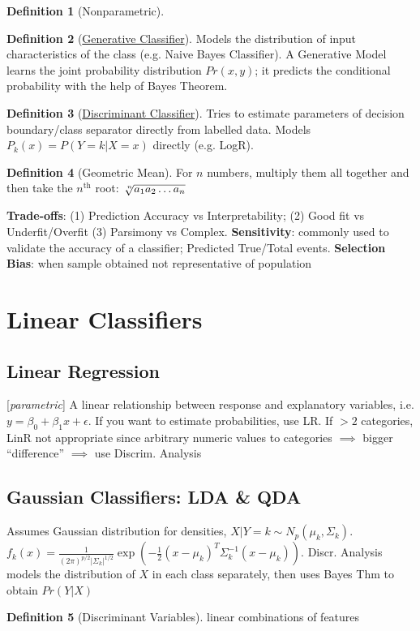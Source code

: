\documentclass[9pt]{article}
\theoremstyle{definition}
\newtheorem{definition}{Definition}[section]
\begin{document}
\begin{multicols}{2}
\begin{definition}[Nonparametric]
\end{definition}
\begin{definition}[\href{https://medium.com/@mlengineer/generative-and-discriminative-models-af5637a66a3}{Generative Classifier}]
    Models the distribution of input characteristics of the class (e.g. Naive Bayes Classifier).  A Generative Model learns the joint probability distribution $Pr(x,y)$; it predicts the conditional probability with the help of Bayes Theorem.
\end{definition}
\begin{definition}[\href{https://medium.com/@mlengineer/generative-and-discriminative-models-af5637a66a3}{Discriminant Classifier}]
    Tries to estimate parameters of decision boundary/class separator directly from labelled data. Models $P_k(x)=P(Y=k|X=x)$ directly (e.g. LogR).
\end{definition}
\begin{definition}[Geometric Mean]
    For $n$ numbers, multiply them all together and then take the $n^{\text{th}}$ root: $\sqrt[\leftroot{-2}\uproot{2}n]{a_1 a_2\dots a_n}$
\end{definition}
\textbf{Trade-offs}: (1) Prediction Accuracy vs Interpretability; (2) Good fit vs Underfit/Overfit (3) Parsimony vs Complex. \textbf{Sensitivity}: commonly used to validate the accuracy of a classifier; Predicted True/Total events. \textbf{Selection Bias}: when sample obtained not representative of population
\section{Linear Classifiers}
\subsection{Linear Regression}
[\textit{parametric}] A linear relationship between response and explanatory variables, i.e. $y = \beta_0+\beta_1x+\epsilon$.  If you want to estimate probabilities, use LR.  If $>2$ categories, LinR not appropriate since arbitrary numeric values to categories $\implies$ bigger ``difference'' $\implies$ use Discrim. Analysis
\subsection{Gaussian Classifiers: LDA \& QDA}
Assumes Gaussian distribution for densities, $X|Y=k\sim N_p(\mu_k,\Sigma_k)$.  $f_k(x) = \frac{1}{(2\pi)^{p/2}\vert\Sigma_k\vert^{1/2}}\exp\left(-\frac{1}{2}(x-\mu_k)^T\Sigma_k^{-1}(x-\mu_k)\right)$.  Discr. Analysis models the distribution of $X$ in each class separately, then uses Bayes Thm to obtain $Pr(Y|X)$
\begin{definition}[Discriminant Variables]
    linear combinations of features
\end{definition}

\end{multicols}
\end{document}
